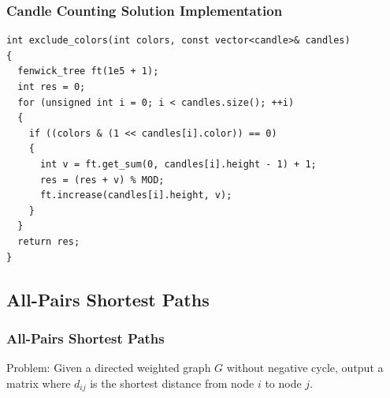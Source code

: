 \documentclass{beamer}
\begin{document}
\begin{frame}[containsverbatim]
\frametitle{Candle Counting Solution Implementation}
\scriptsize

\begin{lstlisting}
int exclude_colors(int colors, const vector<candle>& candles)
{
  fenwick_tree ft(1e5 + 1);
  int res = 0;
  for (unsigned int i = 0; i < candles.size(); ++i)
  {
    if ((colors & (1 << candles[i].color)) == 0)
    {
      int v = ft.get_sum(0, candles[i].height - 1) + 1;
      res = (res + v) % MOD;
      ft.increase(candles[i].height, v);
    }
  }
  return res;
}
\end{lstlisting}

\end{frame}

\fi

\subsection{All-Pairs Shortest Paths}

\begin{frame}%
\frametitle{All-Pairs Shortest Paths}

\begin{mdframed}[style=exampledefault]
Problem: Given a directed weighted graph $G$ without negative cycle, output a matrix where $d_{ij}$ is the shortest
distance from node $i$ to node $j$.
\end{mdframed}


\end{frame}
\end{document}
